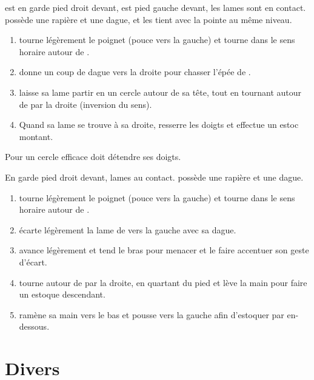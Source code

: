 \begin{technique}

\A est en garde pied droit devant, \D est pied gauche devant, les lames sont en contact.
\D possède une rapière et une dague, et les tient avec la pointe au même niveau.

\begin{enumerate}
	\item \A tourne légèrement le poignet (pouce vers la gauche) et tourne dans le sens horaire autour de \D.
	\item \D donne un coup de dague vers la droite pour chasser l'épée de \A.
	\item \A laisse sa lame partir en un cercle autour de sa tête, tout en tournant autour de \D par la droite (inversion du sens).
	\item Quand sa lame se trouve à sa droite, \A resserre les doigts et effectue un estoc montant.
\end{enumerate}

Pour un cercle efficace \A doit détendre ses doigts.

\end{technique}


\begin{technique}

En garde pied droit devant, lames au contact.
\D possède une rapière et une dague.

\begin{enumerate}
	\item \A tourne légèrement le poignet (pouce vers la gauche) et tourne dans le sens horaire autour de \D.
	\item \D écarte légèrement la lame de \A vers la gauche avec sa dague.
	\item \A avance légèrement et tend le bras pour menacer \D et le faire accentuer son geste d'écart.
	\item \A tourne autour de \D par la droite, en quartant du pied et lève la main pour faire un estoque descendant.
	\item \A ramène sa main vers le bas et pousse vers la gauche afin d'estoquer \D par en-dessous.
\end{enumerate}

\end{technique}


\section{Divers}



